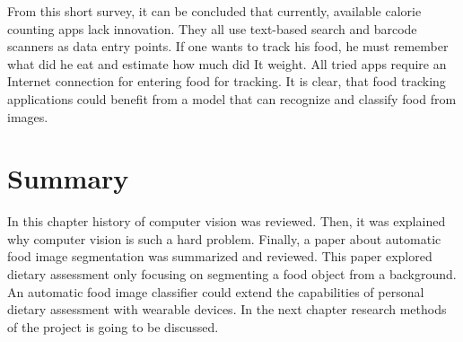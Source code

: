 From this short survey, it can be concluded that currently, available calorie counting apps lack innovation. They all use text-based search and barcode scanners as data entry points. If one wants to track his food, he must remember what did he eat and estimate how much did It weight. All tried apps require an Internet connection for entering food for tracking.  It is clear, that food tracking applications could benefit from a model that can recognize and classify food from images.

\section{Summary}
In this chapter history of computer vision was reviewed. Then, it was explained why computer vision is such a hard problem. Finally, a  paper about automatic food image segmentation was summarized and reviewed. This paper explored dietary assessment only focusing on segmenting a food object from a background. An automatic food image classifier could extend the capabilities of personal dietary assessment with wearable devices. In the next chapter research methods of the project is going to be discussed.